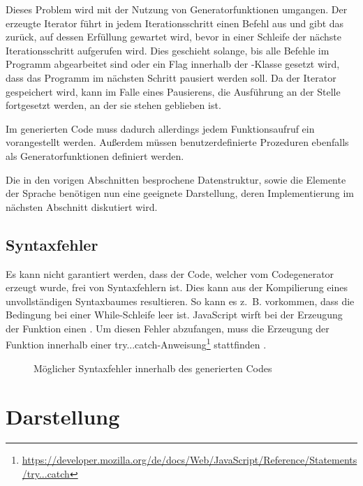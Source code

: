 Dieses Problem wird mit der Nutzung von Generatorfunktionen umgangen. Der erzeugte Iterator führt in jedem Iterationsschritt einen Befehl aus und gibt das  zurück, auf dessen Erfüllung gewartet wird, bevor in einer Schleife der nächste Iterationsschritt aufgerufen wird. Dies geschieht solange, bis alle Befehle im Programm abgearbeitet sind oder ein Flag innerhalb der -Klasse gesetzt wird, dass das Programm im nächsten Schritt pausiert werden soll. Da der Iterator gespeichert wird, kann im Falle eines Pausierens, die Ausführung an der Stelle fortgesetzt werden, an der sie stehen geblieben ist.

Im generierten Code muss dadurch allerdings jedem Funktionsaufruf ein  vorangestellt werden. Außerdem müssen benutzerdefinierte Prozeduren ebenfalls als Generatorfunktionen definiert werden.

Die in den vorigen Abschnitten besprochene Datenstruktur, sowie die Elemente der Sprache benötigen nun eine geeignete Darstellung, deren Implementierung im nächsten Abschnitt diskutiert wird.

\subsection{Syntaxfehler}
\label{sec:implementation:syntax-errors}

Es kann nicht garantiert werden, dass der Code, welcher vom Codegenerator erzeugt wurde, frei von Syntaxfehlern ist. Dies kann aus der Kompilierung eines unvollständigen Syntaxbaumes resultieren. So kann es z.~B. vorkommen, dass die Bedingung bei einer While-Schlei\-fe leer ist. JavaScript wirft bei der Erzeugung der Funktion einen . Um diesen Fehler abzufangen, muss die Erzeugung der Funktion innerhalb einer try...catch-An\-wei\-sung\footnote{\url{https://developer.mozilla.org/de/docs/Web/JavaScript/Reference/Statements/try...catch}} stattfinden .

\begin{figure}
  
  \caption{Möglicher Syntaxfehler innerhalb des generierten Codes}
  \label{fig:implementation:evaluation:try-catch}
\end{figure}

\section{Darstellung}
\label{sec:implementation:rendering}

